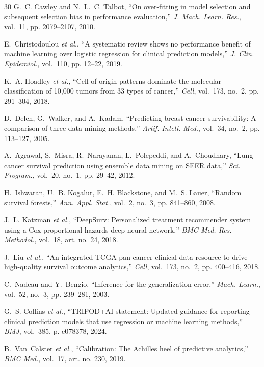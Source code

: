 \begin{thebibliography}{30}
G.~C. Cawley and N.~L.~C. Talbot, ``On over-fitting in model selection and subsequent selection bias in performance evaluation,'' \emph{J. Mach. Learn. Res.}, vol.~11, pp. 2079--2107, 2010.

E.~Christodoulou \emph{et al.}, ``A systematic review shows no performance benefit of machine learning over logistic regression for clinical prediction models,'' \emph{J. Clin. Epidemiol.}, vol.~110, pp. 12--22, 2019.

K.~A. Hoadley \emph{et al.}, ``Cell-of-origin patterns dominate the molecular classification of 10,000 tumors from 33 types of cancer,'' \emph{Cell}, vol.~173, no.~2, pp. 291--304, 2018.

D.~Delen, G.~Walker, and A.~Kadam, ``Predicting breast cancer survivability: A comparison of three data mining methods,'' \emph{Artif. Intell. Med.}, vol.~34, no.~2, pp. 113--127, 2005.

A.~Agrawal, S.~Misra, R.~Narayanan, L.~Polepeddi, and A.~Choudhary, ``Lung cancer survival prediction using ensemble data mining on SEER data,'' \emph{Sci. Program.}, vol.~20, no.~1, pp. 29--42, 2012.

H.~Ishwaran, U.~B. Kogalur, E.~H. Blackstone, and M.~S. Lauer, ``Random survival forests,'' \emph{Ann. Appl. Stat.}, vol.~2, no.~3, pp. 841--860, 2008.

J.~L. Katzman \emph{et al.}, ``DeepSurv: Personalized treatment recommender system using a Cox proportional hazards deep neural network,'' \emph{BMC Med. Res. Methodol.}, vol.~18, art. no. 24, 2018.

J.~Liu \emph{et al.}, ``An integrated TCGA pan-cancer clinical data resource to drive high-quality survival outcome analytics,'' \emph{Cell}, vol.~173, no.~2, pp. 400--416, 2018.

C.~Nadeau and Y.~Bengio, ``Inference for the generalization error,'' \emph{Mach. Learn.}, vol.~52, no.~3, pp. 239--281, 2003.

G.~S. Collins \emph{et al.}, ``TRIPOD+AI statement: Updated guidance for reporting clinical prediction models that use regression or machine learning methods,'' \emph{BMJ}, vol.~385, p. e078378, 2024.

B.~Van~Calster \emph{et al.}, ``Calibration: The Achilles heel of predictive analytics,'' \emph{BMC Med.}, vol.~17, art. no. 230, 2019.


\end{thebibliography}
